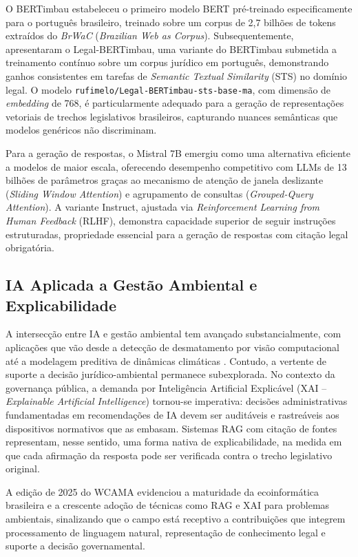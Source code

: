 \documentclass[12pt]{article}
\begin{document}
O BERTimbau \cite{souza:2020} estabeleceu o primeiro modelo BERT pré-treinado especificamente para o português brasileiro, treinado sobre um corpus de 2,7 bilhões de tokens extraídos do \textit{BrWaC} (\textit{Brazilian Web as Corpus}). Subsequentemente, \cite{rufimelo:2022} apresentaram o Legal-BERTimbau, uma variante do BERTimbau submetida a treinamento contínuo sobre um corpus jurídico em português, demonstrando ganhos consistentes em tarefas de \textit{Semantic Textual Similarity} (STS) no domínio legal. O modelo \texttt{rufimelo/Legal-BERTimbau-sts-base-ma}, com dimensão de \textit{embedding} de 768, é particularmente adequado para a geração de representações vetoriais de trechos legislativos brasileiros, capturando nuances semânticas que modelos genéricos não discriminam.

Para a geração de respostas, o Mistral 7B \cite{jiang:2023} emergiu como uma alternativa eficiente a modelos de maior escala, oferecendo desempenho competitivo com LLMs de 13 bilhões de parâmetros graças ao mecanismo de atenção de janela deslizante (\textit{Sliding Window Attention}) e agrupamento de consultas (\textit{Grouped-Query Attention}). A variante Instruct, ajustada via \textit{Reinforcement Learning from Human Feedback} (RLHF), demonstra capacidade superior de seguir instruções estruturadas, propriedade essencial para a geração de respostas com citação legal obrigatória.

\subsection{IA Aplicada a Gestão Ambiental e Explicabilidade}

A intersecção entre IA e gestão ambiental tem avançado substancialmente, com aplicações que vão desde a detecção de desmatamento por visão computacional até a modelagem preditiva de dinâmicas climáticas \cite{wcama:2025}. Contudo, a vertente de suporte a decisão jurídico-ambiental permanece subexplorada. No contexto da governança pública, a demanda por Inteligência Artificial Explicável (XAI -- \textit{Explainable Artificial Intelligence}) tornou-se imperativa: decisões administrativas fundamentadas em recomendações de IA devem ser auditáveis e rastreáveis aos dispositivos normativos que as embasam. Sistemas RAG com citação de fontes representam, nesse sentido, uma forma nativa de explicabilidade, na medida em que cada afirmação da resposta pode ser verificada contra o trecho legislativo original.

A edição de 2025 do WCAMA evidenciou a maturidade da ecoinformática brasileira e a crescente adoção de técnicas como RAG e XAI para problemas ambientais, sinalizando que o campo está receptivo a contribuições que integrem processamento de linguagem natural, representação de conhecimento legal e suporte a decisão governamental.
\end{document}
